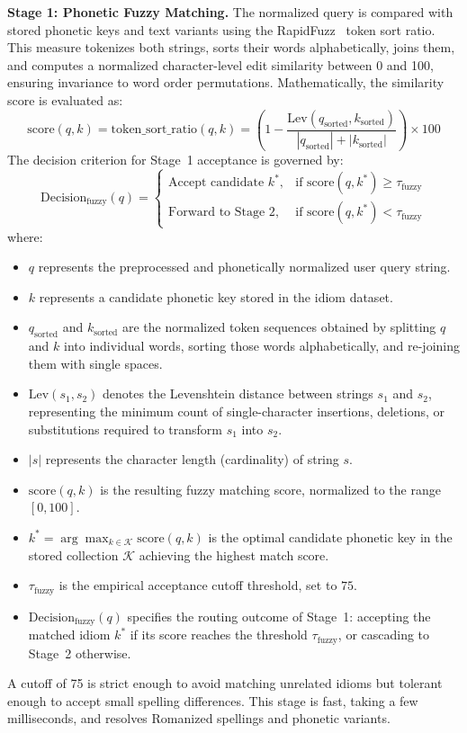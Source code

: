 \documentclass[12pt,a4paper]{article}
\begin{document}
\textbf{Stage 1: Phonetic Fuzzy Matching.} The normalized query is compared with stored phonetic keys and text variants using the RapidFuzz~\cite{rapidfuzz} token sort ratio. This measure tokenizes both strings, sorts their words alphabetically, joins them, and computes a normalized character-level edit similarity between 0 and 100, ensuring invariance to word order permutations. Mathematically, the similarity score is evaluated as:
\begin{equation}
\label{eq:token_sort_ratio}
\mathrm{score}(q, k) = \mathrm{token\_sort\_ratio}(q, k) = \left( 1 - \frac{\mathrm{Lev}(q_{\mathrm{sorted}}, k_{\mathrm{sorted}})}{|q_{\mathrm{sorted}}| + |k_{\mathrm{sorted}}|} \right) \times 100
\end{equation}
The decision criterion for Stage~1 acceptance is governed by:
\begin{equation}
\label{eq:fuzzy_decision}
\mathrm{Decision}_{\mathrm{fuzzy}}(q) = \begin{cases}
\text{Accept candidate } k^*, & \text{if } \mathrm{score}(q, k^*) \ge \tau_{\mathrm{fuzzy}} \\
\text{Forward to Stage 2}, & \text{if } \mathrm{score}(q, k^*) < \tau_{\mathrm{fuzzy}}
\end{cases}
\end{equation}
where:
\begin{itemize}
  \item $q$ represents the preprocessed and phonetically normalized user query string.
  \item $k$ represents a candidate phonetic key stored in the idiom dataset.
  \item $q_{\mathrm{sorted}}$ and $k_{\mathrm{sorted}}$ are the normalized token sequences obtained by splitting $q$ and $k$ into individual words, sorting those words alphabetically, and re-joining them with single spaces.
  \item $\mathrm{Lev}(s_1, s_2)$ denotes the Levenshtein distance between strings $s_1$ and $s_2$, representing the minimum count of single-character insertions, deletions, or substitutions required to transform $s_1$ into $s_2$.
  \item $|s|$ represents the character length (cardinality) of string $s$.
  \item $\mathrm{score}(q, k)$ is the resulting fuzzy matching score, normalized to the range $[0, 100]$.
  \item $k^* = \arg\max_{k \in \mathcal{K}} \mathrm{score}(q, k)$ is the optimal candidate phonetic key in the stored collection $\mathcal{K}$ achieving the highest match score.
  \item $\tau_{\mathrm{fuzzy}}$ is the empirical acceptance cutoff threshold, set to $75$.
  \item $\mathrm{Decision}_{\mathrm{fuzzy}}(q)$ specifies the routing outcome of Stage~1: accepting the matched idiom $k^*$ if its score reaches the threshold $\tau_{\mathrm{fuzzy}}$, or cascading to Stage~2 otherwise.
\end{itemize}
A cutoff of 75 is strict enough to avoid matching unrelated idioms but tolerant enough to accept small spelling differences. This stage is fast, taking a few milliseconds, and resolves Romanized spellings and phonetic variants.
\end{document}
